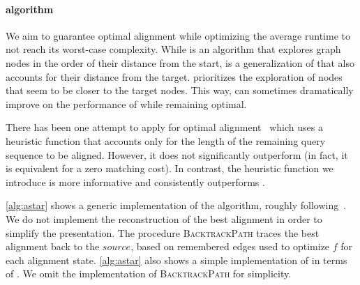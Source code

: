 \paragraph{\A algorithm}
We aim to guarantee optimal alignment while optimizing the average runtime
to not reach its worst-case complexity. While \dijkstra is an algorithm that
explores graph nodes in the order of their distance from the start, \A is a
generalization of \dijkstra that also accounts for their distance from the
target. \A prioritizes the exploration of nodes that seem to be closer to the
target nodes. This way, \A can sometimes dramatically improve on the performance
of \dijkstra while remaining optimal.

There has been one attempt to apply \A for optimal
alignment~\cite{dox2018efficient} which uses a heuristic function that accounts
only for the length of the remaining query sequence to be aligned. However, it
does not significantly outperform \dijkstra (in fact, it is equivalent for
a zero matching cost).
%
In contrast, the heuristic function we introduce is more informative and
consistently outperforms \dijkstra.

\cref{alg:astar} shows a generic implementation of the \A algorithm,
roughly following~\cite{dechter_generalized_1985}.
We do not implement the reconstruction of the best alignment in order to simplify the presentation.
The procedure \mbox{\textsc{BacktrackPath}} traces the best alignment back to the $source$, based on remembered edges used to optimize $f$ for each alignment state.
%
\cref{alg:astar} also shows a simple implementation of \dijkstra in terms of \A.
We omit the implementation of \textsc{BacktrackPath} for simplicity.

